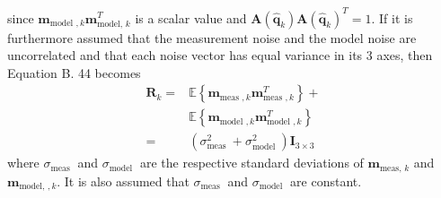 since $\mathbf{m}_{\text {model }, k} \mathbf{m}_{\text {model, } k}^{T}$ is a scalar value and $\mathbf{A}\left(\hat{\mathbf{q}}_{k}\right) \mathbf{A}\left(\hat{\mathbf{q}}_{k}\right)^{T}=1$. If it is furthermore assumed that the measurement noise and the model noise are uncorrelated and that each noise vector has equal variance in its 3 axes, then Equation B. 44 becomes
$$
\begin{aligned}
\mathbf{R}_{k}=& \mathbb{E}\left\{\mathbf{m}_{\text {meas }, k} \mathbf{m}_{\text {meas }, k}^{T}\right\}+\\
& \mathbb{E}\left\{\mathbf{m}_{\text {model }, k} \mathbf{m}_{\text {model }, k}^{T}\right\} \\
=&\left(\sigma_{\text {meas }}^{2}+\sigma_{\text {model }}^{2}\right) \mathbf{I}_{3 \times 3}
\end{aligned}
$$
where $\sigma_{\text {meas }}$ and $\sigma_{\text {model }}$ are the respective standard deviations of $\mathbf{m}_{\text {meas, } k}$ and $\mathbf{m}_{\text {model, }, k}$. It is also assumed that $\sigma_{\text {meas }}$ and $\sigma_{\text {model }}$ are constant.